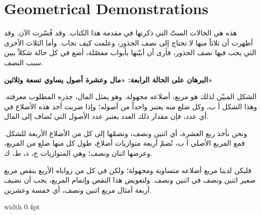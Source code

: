 \documentclass[11pt,a4paper,openany,oneside]{book}
\begin{document}
\chapter{Geometrical Demonstrations}
\label{ch:geom}

\noindent\begin{minipage}[t]{0.48\textwidth}
\raggedleft

\begin{Arabic}
هذه هي الحالات الستّ التي ذكرتها في مقدمة هذا الكتاب. وقد فُسّرت الآن. وقد أظهرت أن ثلاثاً منها لا تحتاج إلى نصف الجذور، وعلمت كيف تجاب. وأما الثلاث الأخرى التي يجب فيها نصف الجذور، فأرى أن أبيّنها بأبواب مفصّلة، أضع في كل حالة شكلاً يبين سبب النصف.

\textbf{البرهان على الحالة الرابعة: «مال وعشرة أصول يساوي تسعة وثلاثين»}

الشكل المبيّن لذلك هو مربع، أضلاعه مجهولة. وهو يمثل المال، جذره المطلوب معرفته. وهذا الشكل أ ب، وكل ضلع منه يعتبر واحداً من أصوله؛ وإذا ضربت أحد هذه الأضلاع في أي عدد، فإن مقدار ذلك العدد يعتبر عدد الأصول التي تُضاف إلى المال.

ونحن نأخذ ربع العشرة، أي اثنين ونصف، ونضمّها إلى كل من الأضلاع الأربعة للشكل. فمع المربع الأصلي أ ب، تُضمّ أربعة متوازيات أضلاع، طول كل منها ضلع من المربع، وعرضها اثنان ونصف؛ وهي المتوازيات ج، د، ط، ك.

فليكن لدينا مربع أضلاعه متساوية ومجهولة؛ ولكن في كل من زواياه الأربع ينقص مربع صغير اثنين ونصف في اثنين ونصف. ولتعويض هذا النقص وإتمام المربع، يجب أن نضيف أربعة أمثال مربع اثنين ونصف، أي خمسة وعشرين.
\end{Arabic}

\end{minipage}%
\hfill\vrule width 0.4pt\hfill
\end{document}
